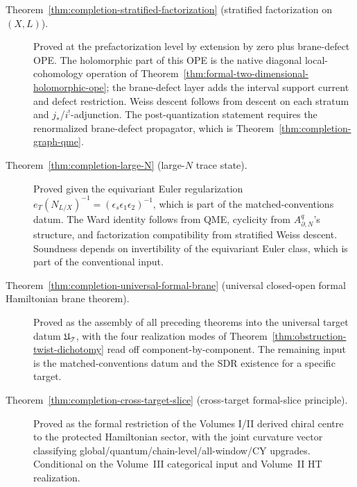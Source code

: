 \begin{description}
\item[Theorem~\ref{thm:completion-stratified-factorization}
  (stratified factorization on \((X,L)\)).]  Proved at the
  prefactorization level by extension by zero plus brane-defect
  OPE.  The holomorphic part of this OPE is the native diagonal
  local-cohomology operation of
  Theorem~\ref{thm:formal-two-dimensional-holomorphic-ope}; the
  brane-defect layer adds the interval support current and defect
  restriction.  Weiss descent follows from descent on each stratum
  and \(j_*\)/\(i^!\)-adjunction.  The post-quantization
  statement requires the renormalized brane-defect propagator,
  which is Theorem~\ref{thm:completion-graph-qme}.

\item[Theorem~\ref{thm:completion-large-N} (large-\(N\) trace
  state).]  Proved given the equivariant Euler regularization
  \(e_T(N_{L/X})^{-1}=(\epsilon_s\epsilon_1\epsilon_2)^{-1}\),
  which is part of the matched-conventions datum.  The Ward
  identity follows from QME, cyclicity from
  \(A^q_{\partial,N}\)'s structure, and factorization
  compatibility from stratified Weiss descent.  Soundness depends
  on invertibility of the equivariant Euler class, which is part
  of the conventional input.

\item[Theorem~\ref{thm:completion-universal-formal-brane} (universal
  closed-open formal Hamiltonian brane theorem).]  Proved as the
  assembly of all preceding theorems into the universal target
  datum \(\mathfrak U_{\mathcal T}\), with the four realization
  modes of Theorem~\ref{thm:obstruction-twist-dichotomy} read off
  component-by-component.  The remaining input is the
  matched-conventions datum and the SDR existence for a specific
  target.

\item[Theorem~\ref{thm:completion-cross-target-slice} (cross-target
  formal-slice principle).]  Proved as the formal restriction of
  the Volumes I/II derived chiral centre to the protected
  Hamiltonian sector, with the joint curvature vector
  classifying global/quantum/chain-level/all-window/CY
  upgrades.  Conditional on the Volume~III categorical input and
  Volume~II HT realization.
\end{description}

